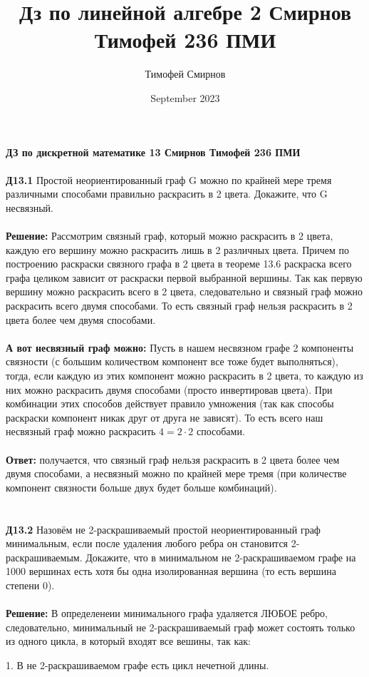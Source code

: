 \documentclass[a4paper, 12pt]{article}
\title{Дз по линейной алгебре 2 Смирнов Тимофей 236 ПМИ}
\author{Тимофей Смирнов}
\date{September 2023}
\begin{document}
    {\center \bf \large ДЗ по дискретной математике 13 Смирнов Тимофей 236 ПМИ}
    \\
    \\ \textbf{Д13.1} Простой неориентированный граф G можно по крайней мере тремя различными способами
    правильно раскрасить в 2 цвета. Докажите, что G несвязный.
    \\
    \\ \textbf{Решение: } Рассмотрим связный граф, который можно раскрасить в 2 цвета, каждую его вершину можно раскрасить лишь в 2 различных цвета. Причем по построению раскраски связного графа в 2 цвета в теореме 13.6 раскраска всего графа целиком зависит от раскраски первой выбранной вершины. Так как первую вершину можно раскрасить всего в 2 цвета, следовательно и связный граф можно раскрасить всего двумя способами. То есть связный граф нельзя раскрасить в 2 цвета более чем двумя способами.
    \\
    \\ \textbf{А вот несвязный граф можно:} Пусть в нашем несвязном графе 2 компоненты связности (с большим количеством компонент все тоже будет выполняться), тогда, если каждую из этих компонент можно раскрасить в 2 цвета, то каждую из них можно раскрасить двумя способами (просто инвертировав цвета). При комбинации этих способов действует правило умножения (так как способы раскраски компонент никак друг от друга не зависят). То есть всего наш несвязный граф можно раскрасить $4 = 2 \cdot 2$ способами.
    \\
    \\ \textbf{Ответ: } получается, что связный граф нельзя раскрасить в 2 цвета более чем двумя способами, а несвязный можно по крайней мере тремя (при количестве компонент связности больше двух будет больше комбинаций).
    \\
    \\
    \\ \textbf{Д13.2} Назовём не 2-раскрашиваемый простой неориентированный граф минимальным, если после
    удаления любого ребра он становится 2-раскрашиваемым. Докажите, что в минимальном не 2-раскрашиваемом графе на 1000 вершинах есть хотя бы одна изолированная вершина (то есть вершина
    степени 0).
    \\
    \\ \textbf{Решение: } В определенеии минимального графа удаляется ЛЮБОЕ ребро, следовательно, минимальный не 2-раскрашиваемый граф может состоять только из одного цикла, в который входят все вешины, так как:
    \par 1. В не 2-раскрашиваемом графе есть цикл нечетной длины.
\end{document}
